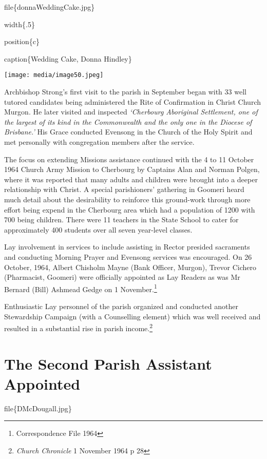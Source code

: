 file\{donnaWeddingCake.jpg\}

width\{.5\}

position\{c\}

caption\{Wedding Cake, Donna Hindley\}

\texttt{[image: media/image50.jpeg]}

Archbishop Strong's first visit to the parish in September began with 33 well tutored candidates being administered the Rite of Confirmation in Christ Church Murgon. He later visited and inspected \emph{`Cherbourg Aboriginal Settlement, one of the largest of its kind in the Commonwealth and the only one in the Diocese of Brisbane.'} His Grace conducted Evensong in the Church of the Holy Spirit and met personally with congregation members after the service.

The focus on extending Missions assistance continued with the 4 to 11 October 1964 Church Army Mission to Cherbourg by Captains Alan and Norman Polgen, where it was reported that many adults and children were brought into a deeper relationship with Christ. A special parishioners' gathering in Goomeri heard much detail about the desirability to reinforce this ground-work through more effort being expend in the Cherbourg area which had a population of 1200 with 700 being children. There were 11 teachers in the State School to cater for approximately 400 students over all seven year-level classes.

Lay involvement in services to include assisting in Rector presided sacraments and conducting Morning Prayer and Evensong services was encouraged. On 26 October, 1964, Albert Chisholm Mayne (Bank Officer, Murgon), Trevor Cichero (Pharmacist, Goomeri) were officially appointed as Lay Readers as was Mr Bernard (Bill) Ashmead Gedge on 1 November.\footnote{Correspondence File 1964}

Enthusiastic Lay personnel of the parish organized and conducted another Stewardship Campaign (with a Counselling element) which was well received and resulted in a substantial rise in parish income.\footnote{\emph{Church Chronicle} 1 November 1964 p 28}

\hypertarget{the-second-parish-assistant-appointed}{%
\section{The Second Parish Assistant Appointed}\label{the-second-parish-assistant-appointed}}

file\{DMcDougall.jpg\}

